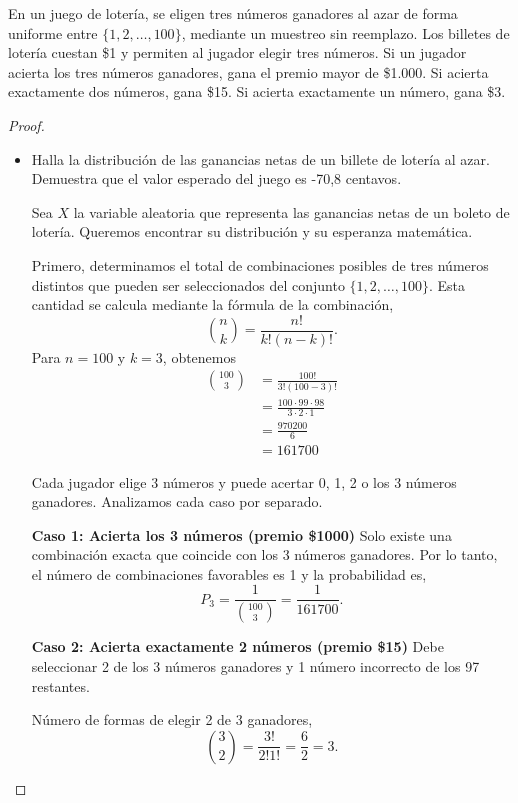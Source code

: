 \documentclass{article}
\begin{document}
En un juego de lotería, se eligen tres números ganadores al azar de forma uniforme entre \( \{1, 2, \ldots, 100\} \), mediante un muestreo sin reemplazo. Los billetes de lotería cuestan \$1 y permiten al jugador elegir tres números. Si un jugador acierta los tres números ganadores, gana el premio mayor de \$1.000. Si acierta exactamente dos números, gana \$15. Si acierta exactamente un número, gana \$3.
\begin{proof}
\begin{itemize}

\item[(a)] Halla la distribución de las ganancias netas de un billete de lotería al azar. Demuestra que el valor esperado del juego es -70,8 centavos.


Sea \( X \) la variable aleatoria que representa las ganancias netas de un boleto de lotería. Queremos encontrar su distribución y su esperanza matemática.

Primero, determinamos el total de combinaciones posibles de tres números distintos que pueden ser seleccionados del conjunto \( \{1, 2, \ldots, 100\} \). Esta cantidad se calcula mediante la fórmula de la combinación,
\[
\binom{n}{k} = \frac{n!}{k!(n - k)!}.
\]
Para \( n = 100 \) y \( k = 3 \), obtenemos
\begin{align*}
\binom{100}{3} &= \frac{100!}{3!(100 - 3)!} \\
&= \frac{100 \cdot 99 \cdot 98}{3 \cdot 2 \cdot 1} \\
&= \frac{970200}{6} \\
&= 161700
\end{align*}

Cada jugador elige 3 números y puede acertar 0, 1, 2 o los 3 números ganadores. Analizamos cada caso por separado.

{\textbf{Caso 1: Acierta los 3 números (premio \$1000)}}
Solo existe una combinación exacta que coincide con los 3 números ganadores. Por lo tanto, el número de combinaciones favorables es 1 y la probabilidad es,
\begin{equation}
 \label{1}
  P_3 = \frac{1}{\binom{100}{3}} = \frac{1}{161700}.  
\end{equation}


{\textbf{Caso 2: Acierta exactamente 2 números (premio \$15)}}
Debe seleccionar 2 de los 3 números ganadores y 1 número incorrecto de los 97 restantes.

Número de formas de elegir 2 de 3 ganadores,
\[
\binom{3}{2} = \frac{3!}{2!1!} = \frac{6}{2} = 3.
\]


\end{itemize}
\end{proof}
\end{document}
